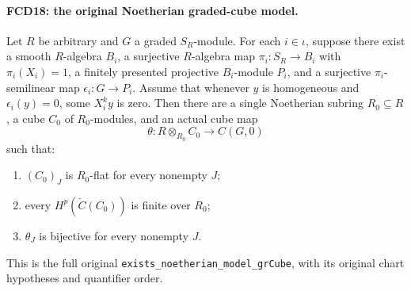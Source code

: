 \documentclass[11pt,a4paper]{article}
\numberwithin{equation}{section}
\theoremstyle{remark}\newtheorem{remark}[theorem]{Remark}
\begin{document}
\paragraph{FCD18: the original Noetherian graded-cube model.}
\label{claim:FCD18}
Let $R$ be arbitrary and $G$ a graded $S_R$-module.  For each
$i\in\iota$, suppose there exist a smooth $R$-algebra $B_i$,
a surjective $R$-algebra map $\pi_i:S_R\to B_i$ with
$\pi_i(X_i)=1$, a finitely presented projective $B_i$-module
$P_i$, and a surjective $\pi_i$-semilinear map
$\epsilon_i:G\to P_i$.  Assume that whenever $y$ is
homogeneous and $\epsilon_i(y)=0$, some $X_i^ky$ is zero.
Then there are a single Noetherian subring $R_0\subseteq R$,
a cube $C_0$ of $R_0$-modules, and an actual cube map
\[
 \theta:R\otimes_{R_0}C_0\longrightarrow C(G,0)       \tag{FCD.18}\label{FCD.18}
\]
such that:
\begin{enumerate}
\item $(C_0)_J$ is $R_0$-flat for every nonempty $J$;
\item every $H^p(\check C(C_0))$ is finite over $R_0$;
\item $\theta_J$ is bijective for every nonempty $J$.
\end{enumerate}
This is the full original
\texttt{exists\_\allowbreak{}noetherian\_\allowbreak{}model\_\allowbreak{}gr\allowbreak{}Cube}, with its original
chart hypotheses and quantifier order.
\end{document}
